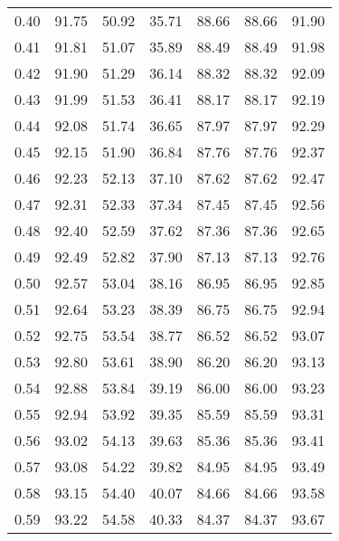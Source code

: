 \begin{tabular}{|c|c|c|c|c|c|c|}
      0.40 &     91.75 &     50.92 &      35.71 &   88.66 &      88.66 &         91.90 \\
      0.41 &     91.81 &     51.07 &      35.89 &   88.49 &      88.49 &         91.98 \\
      0.42 &     91.90 &     51.29 &      36.14 &   88.32 &      88.32 &         92.09 \\
      0.43 &     91.99 &     51.53 &      36.41 &   88.17 &      88.17 &         92.19 \\
      0.44 &     92.08 &     51.74 &      36.65 &   87.97 &      87.97 &         92.29 \\
      0.45 &     92.15 &     51.90 &      36.84 &   87.76 &      87.76 &         92.37 \\
      0.46 &     92.23 &     52.13 &      37.10 &   87.62 &      87.62 &         92.47 \\
      0.47 &     92.31 &     52.33 &      37.34 &   87.45 &      87.45 &         92.56 \\
      0.48 &     92.40 &     52.59 &      37.62 &   87.36 &      87.36 &         92.65 \\
      0.49 &     92.49 &     52.82 &      37.90 &   87.13 &      87.13 &         92.76 \\
      0.50 &     92.57 &     53.04 &      38.16 &   86.95 &      86.95 &         92.85 \\
      0.51 &     92.64 &     53.23 &      38.39 &   86.75 &      86.75 &         92.94 \\
      0.52 &     92.75 &     53.54 &      38.77 &   86.52 &      86.52 &         93.07 \\
      0.53 &     92.80 &     53.61 &      38.90 &   86.20 &      86.20 &         93.13 \\
      0.54 &     92.88 &     53.84 &      39.19 &   86.00 &      86.00 &         93.23 \\
      0.55 &     92.94 &     53.92 &      39.35 &   85.59 &      85.59 &         93.31 \\
      0.56 &     93.02 &     54.13 &      39.63 &   85.36 &      85.36 &         93.41 \\
      0.57 &     93.08 &     54.22 &      39.82 &   84.95 &      84.95 &         93.49 \\
      0.58 &     93.15 &     54.40 &      40.07 &   84.66 &      84.66 &         93.58 \\
      0.59 &     93.22 &     54.58 &      40.33 &   84.37 &      84.37 &         93.67 \\

\end{tabular}

